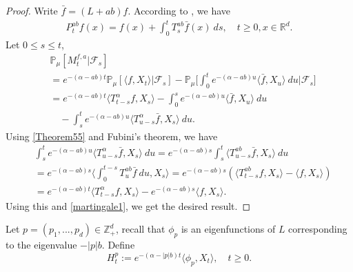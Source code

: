 \documentclass[12pt,a4paper]{amsart}
\theoremstyle{plain}
\theoremstyle{definition}
\numberwithin{equation}{section}
\begin{document}
\begin{proof}
    Write $\bar{f}=(L+ab)f$. According to \cite[Theorem A.55]{Li2011Measure-valued}, we have
\begin{equation}\begin{split}\label{Theorem55}
    P_t^{ab}f(x)= f(x)+\int_0^t T_s^{ab}\bar{f}(x)~ds,\quad t\geq 0,x\in \mathbb R^d.
\end{split}\end{equation}
Let $0\leq s\leq t$,
\begin{equation}\begin{split}
\label{martingale1}
    &\mathbb{P}_{\mu}[M_t^{f,a}|\mathscr{F}_s]
    \\&=e^{-(\alpha-ab)t}\mathbb{P}_{\mu}\left[\langle f,X_t\rangle|\mathscr{F}_s\right]-\mathbb{P}_{\mu}\Big[\int_0^t e^{-(\alpha-ab)u}\langle \bar{f}, X_u\rangle~ du\Big|\mathscr{F}_s\big]
    \\&=e^{-(\alpha-ab)t}\langle T_{t-s}^{\alpha}f, X_s\rangle-\int_0^s e^{-(\alpha-ab)u}\langle \bar{f}, X_u\rangle~ du 
    \\&\quad -\int_s^t e^{-(\alpha-ab)u}\langle T_{u-s}^{\alpha} \bar{f},X_s\rangle~ du.
\end{split}\end{equation}
    Using \eqref{Theorem55} and Fubini's theorem, we have
\begin{equation}\begin{split}
    &\int_s^t e^{-(\alpha-ab)u}\langle T_{u-s}^{\alpha} \bar{f},X_s\rangle~ du=e^{-(\alpha-ab)s}\int_s^t\langle T_{u-s}^{ab}\bar{f},X_s\rangle~du\\
    &=e^{-(\alpha-ab)s}\Big\langle\int_0^{t-s}T_{u}^{ab}\bar{f}~du,X_s\Big\rangle=e^{-(\alpha-ab)s}\left(\langle T_{t-s}^{ab}f,X_s\rangle-\langle
    f,X_s\rangle\right)\\
    &=e^{-(\alpha-ab)t}\langle T_{t-s}^{\alpha}f, X_s\rangle-e^{-(\alpha-ab)s}\langle
    f,X_s\rangle.
\end{split}\end{equation}
   Using this and \eqref{martingale1}, we get the desired result.
\end{proof}

    Let $p=(p_1,...,p_d)\in \mathbb Z_+^d$, recall that $\phi_p$ is an eigenfunctions of $L$ corresponding to the eigenvalue $-|p|b$. Define
\[
    H_t^p
    :=e^{-(\alpha-|p|b)t}\langle\phi_p,X_t\rangle, \quad t\geq 0.
\]
\end{document}
